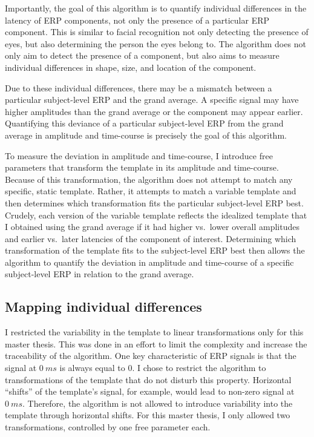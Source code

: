 \documentclass[
  man]{apa7}
\begin{document}
Importantly, the goal of this algorithm is to quantify individual differences in the latency of ERP components, not only the presence of a particular ERP component. This is similar to facial recognition not only detecting the presence of eyes, but also determining the person the eyes belong to. The algorithm does not only aim to detect the presence of a component, but also aims to measure individual differences in shape, size, and location of the component.

Due to these individual differences, there may be a mismatch between a particular subject-level ERP and the grand average. A specific signal may have higher amplitudes than the grand average or the component may appear earlier. Quantifying this deviance of a particular subject-level ERP from the grand average in amplitude and time-course is precisely the goal of this algorithm.

To measure the deviation in amplitude and time-course, I introduce free parameters that transform the template in its amplitude and time-course. Because of this transformation, the algorithm does not attempt to match any specific, static template. Rather, it attempts to match a variable template and then determines which transformation fits the particular subject-level ERP best. Crudely, each version of the variable template reflects the idealized template that I obtained using the grand average if it had higher vs.~lower overall amplitudes and earlier vs.~later latencies of the component of interest. Determining which transformation of the template fits to the subject-level ERP best then allows the algorithm to quantify the deviation in amplitude and time-course of a specific subject-level ERP in relation to the grand average.

\hypertarget{mapping-individual-differences}{%
\subsection{Mapping individual differences}\label{mapping-individual-differences}}

I restricted the variability in the template to linear transformations only for this master thesis. This was done in an effort to limit the complexity and increase the traceability of the algorithm. One key characteristic of ERP signals is that the signal at \(0\ ms\) is always equal to 0. I chose to restrict the algorithm to transformations of the template that do not disturb this property. Horizontal ``shifts'' of the template's signal, for example, would lead to non-zero signal at \(0\ ms\). Therefore, the algorithm is not allowed to introduce variability into the template through horizontal shifts. For this master thesis, I only allowed two transformations, controlled by one free parameter each.
\end{document}
